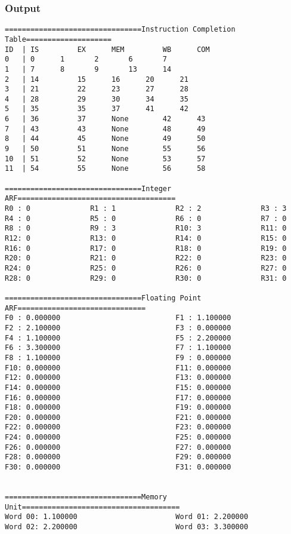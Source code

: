 \documentclass[12pt]{article}
\begin{document}
\subsubsection*{Output}
\begin{verbatim}
================================Instruction Completion Table====================
ID	| IS		 EX		 MEM		 WB		 COM
0	| 0		 1		 2		 6		 7
1	| 7		 8		 9		 13		 14
2	| 14		 15		 16		 20		 21
3	| 21		 22		 23		 27		 28
4	| 28		 29		 30		 34		 35
5	| 35		 35		 37		 41		 42
6	| 36		 37		 None		 42		 43
7	| 43		 43		 None		 48		 49
8	| 44		 45		 None		 49		 50
9	| 50		 51		 None		 55		 56
10	| 51		 52		 None		 53		 57
11	| 54		 55		 None		 56		 58

================================Integer ARF=====================================
R0 : 0              R1 : 1              R2 : 2              R3 : 3             
R4 : 0              R5 : 0              R6 : 0              R7 : 0              
R8 : 0              R9 : 3              R10: 3              R11: 0              
R12: 0              R13: 0              R14: 0              R15: 0              
R16: 0              R17: 0              R18: 0              R19: 0              
R20: 0              R21: 0              R22: 0              R23: 0              
R24: 0              R25: 0              R26: 0              R27: 0              
R28: 0              R29: 0              R30: 0              R31: 0              

================================Floating Point ARF==============================
F0 : 0.000000                           F1 : 1.100000                           
F2 : 2.100000                           F3 : 0.000000                           
F4 : 1.100000                           F5 : 2.200000                           
F6 : 3.300000                           F7 : 1.100000                           
F8 : 1.100000                           F9 : 0.000000                           
F10: 0.000000                           F11: 0.000000                           
F12: 0.000000                           F13: 0.000000                           
F14: 0.000000                           F15: 0.000000                           
F16: 0.000000                           F17: 0.000000                           
F18: 0.000000                           F19: 0.000000                           
F20: 0.000000                           F21: 0.000000                           
F22: 0.000000                           F23: 0.000000                           
F24: 0.000000                           F25: 0.000000                           
F26: 0.000000                           F27: 0.000000                           
F28: 0.000000                           F29: 0.000000                           
F30: 0.000000                           F31: 0.000000                           


================================Memory Unit=====================================
Word 00: 1.100000                       Word 01: 2.200000                       
Word 02: 2.200000                       Word 03: 3.300000
\end{verbatim}
\end{document}
